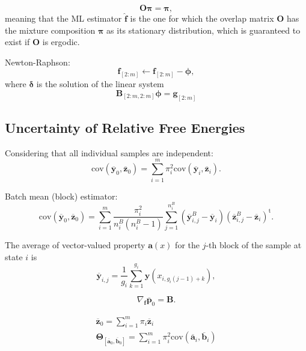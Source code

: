 \documentclass[aip,jcp,reprint,amsmath,amssymb]{revtex4-1}
\newcommand{\mt}[1]{\boldsymbol{\mathbf{#1}}}           %
\newcommand{\vt}[1]{\boldsymbol{\mathbf{#1}}}           %
\newcommand{\tr}[1]{#1^\text{t}}                        %
\begin{document}
\begin{equation}
\mt O \vt \pi = \vt \pi,
\end{equation}
meaning that the ML estimator $\hat{\vt f}$ is the one for which the overlap matrix $\mt O$ has the mixture composition $\vt \pi$ as its stationary distribution, which is guaranteed to exist if $\mt O$ is ergodic.

Newton-Raphson:
\begin{equation}
\label{eq:mblock Newton-Raphson}
{\vt f}_{[2:m]} \leftarrow {\vt f}_{[2:m]} - \vt \phi,
\end{equation}
where $\vt \delta$ is the solution of the linear system
\begin{equation}
{\mt B}_{[2:m,2:m]} {\vt \phi} = {\vt g}_{[2:m]}
\end{equation}

\subsection{Uncertainty of Relative Free Energies}

Considering that all individual samples are independent:
\begin{equation}
\text{cov}(\overline{\vt y}_0,\overline{\vt z}_0) = \sum_{i=1}^m \pi_i^2 \text{cov}(\overline{\vt y}_i,\overline{\vt z}_i).
\end{equation}

Batch mean (block) estimator:\cite{Geyer_1992}
\begin{equation}
\text{cov}(\overline{\vt y}_0,\overline{\vt z}_0) = \sum_{i=1}^m  \frac{\pi_i^2}{n^B_i(n^B_i - 1)} \sum\limits_{j=1}^{n^B_i} (\overline{\vt y}^B_{i,j} - \overline{\vt y}_i) \tr{(\overline{\vt z}^B_{i,j} - \overline{\vt z}_i)}.
\end{equation}

The average of vector-valued property $\vt a(x)$ for the $j$-th block of the sample at state $i$ is
\begin{equation}
\overline{\vt y}_{i,j} = \frac{1}{g_i} \sum_{k=1}^{g_i} {\vt y}\left(x_{i,g_i(j-1)+k}\right),
\end{equation}



\begin{equation}
\nabla_{\vt f}\overline{\vt p}_0 = \mt B.
\end{equation}

\begin{gather}
\overline{\vt z}_0 = \sum_{i=1}^m \pi_i \overline{\vt z}_i \\
\mt \Theta_{[\overline{\vt a}_0,\overline{\vt b}_0]} = \sum_{i=1}^m \pi_i^2 \text{cov}(\overline{\vt a}_i,\overline{\vt b}_i)
\end{gather}
\end{document}
